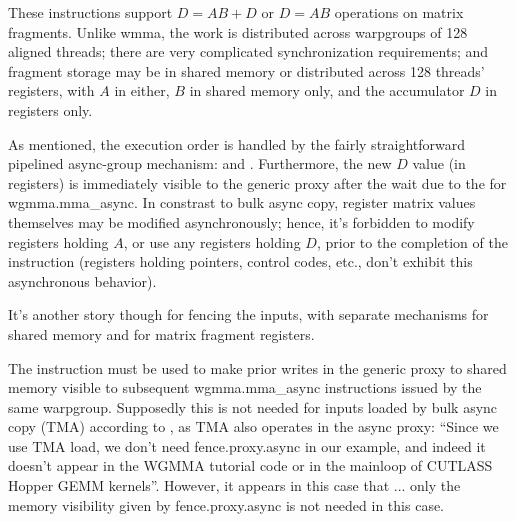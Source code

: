These  instructions support $D = AB + D$ or $D = AB$ operations on matrix fragments. Unlike wmma, the work is distributed across warpgroups of 128 aligned threads; there are very complicated synchronization requirements; and fragment storage may be in shared memory or distributed across 128 threads' registers, with $A$ in either, $B$ in shared memory only, and the accumulator $D$ in registers only.

\filbreak
As mentioned, the execution order is handled by the fairly straightforward pipelined async-group mechanism:  and . Furthermore, the new $D$ value (in registers) is immediately visible to the generic proxy after the wait due to the  for wgmma.mma\_async. In constrast to bulk async copy, register matrix values themselves may be modified asynchronously; hence, it's forbidden to modify registers holding $A$, or use any registers holding $D$, prior to the completion of the instruction (registers holding pointers, control codes, etc., don't exhibit this asynchronous behavior).

\filbreak
It's another story though for fencing the inputs, with separate mechanisms for shared memory and for matrix fragment registers.

 The  instruction must be used to make prior writes in the generic proxy to shared memory visible to subsequent wgmma.mma\_async instructions issued by the same warpgroup. Supposedly this is not needed for inputs loaded by bulk async copy (TMA) according to , as TMA also operates in the async proxy: ``Since we use TMA load, we don’t need fence.proxy.async in our example, and indeed it doesn’t appear in the WGMMA tutorial code or in the mainloop of CUTLASS Hopper GEMM kernels''. However, it appears in this case that  ... only the memory visibility given by fence.proxy.async is not needed in this case.

